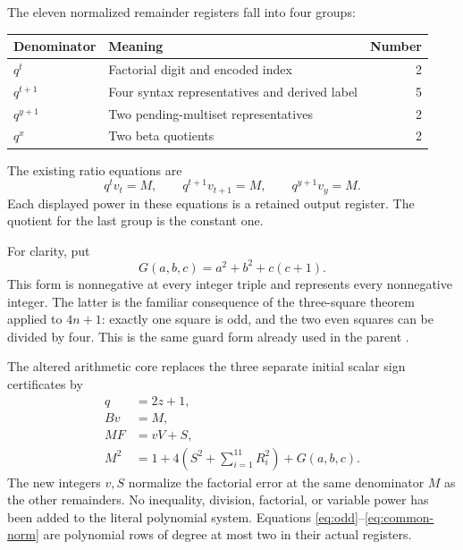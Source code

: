 \documentclass[11pt]{article}
\theoremstyle{definition}\newtheorem{definition}[theorem]{Definition}
\begin{document}
The eleven normalized remainder registers fall into four groups:
\begin{center}
\begin{tabular}{llr}
\hline
Denominator & Meaning & Number\\
\hline
\(q^t\) & Factorial digit and encoded index &2\\
\(q^{t+1}\) & Four syntax representatives and derived label &5\\
\(q^{y+1}\) & Two pending-multiset representatives &2\\
\(q^x\) & Two beta quotients &2\\
\hline
\end{tabular}
\end{center}
The existing ratio equations are
\begin{equation}\label{eq:ratios}
 q^t v_t=M,\qquad q^{t+1}v_{t+1}=M,\qquad
 q^{y+1}v_y=M.
\end{equation}
Each displayed power in these equations is a retained output register.
The quotient for the last group is the constant one.

For clarity, put
\[
 G(a,b,c)=a^2+b^2+c(c+1).
\]
This form is nonnegative at every integer triple and represents every
nonnegative integer. The latter is the familiar consequence of the
three-square theorem applied to \(4n+1\): exactly one square is odd, and
the two even squares can be divided by four. This is the same guard form
already used in the parent \cite{common}.

The altered arithmetic core replaces the three separate initial scalar
sign certificates by
\begin{align}
 q&=2z+1,                                                    \label{eq:odd}\\
 Bv&=M,                                                     \label{eq:factor-ratio}\\
 MF&=vV+S,                                                  \label{eq:factor-error}\\
 M^2&=1+4\left(S^2+\sum_{i=1}^{11}R_i^2\right)+G(a,b,c).
                                                               \label{eq:common-norm}
\end{align}
The new integers \(v,S\) normalize the factorial error at the same
denominator \(M\) as the other remainders. No inequality, division,
factorial, or variable power has been added to the literal polynomial
system. Equations \eqref{eq:odd}--\eqref{eq:common-norm} are polynomial
rows of degree at most two in their actual registers.
\end{document}
